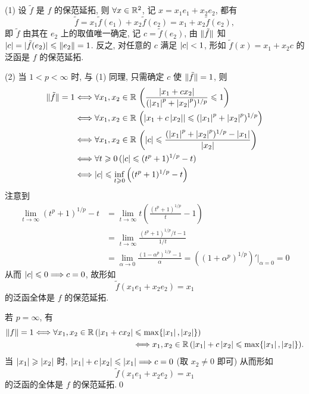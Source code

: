 	\begin{Proof}
		(1) 设 $ \tilde{f} $ 是 $ f $ 的保范延拓, 则 $ \forall x\in\mathbb{R}^{2} $, 记 $ x=x_{1}e_{1}+x_{2}e_{2} $, 都有
		\[
			\tilde{f} = x_{1}\tilde{f}(e_{1})+x_{2}\tilde{f}(e_{2})=x_{1}+x_{2}\tilde{f}(e_{2}),
		\]
		即 $ \tilde{f} $ 由其在 $ e_{2} $ 上的取值唯一确定, 记 $ c=\tilde{f}(e_{2}) $, 由 $ \lVert \tilde{f}\rVert $ 知 $ \left| c \right| =\lvert \tilde{f}(e_{2})\rvert\leqslant\left\| e_{2} \right\|=1 $. 反之, 对任意的 $ c $ 满足 $ \left| c \right| <1 $, 形如 $ \tilde{f}(x)=x_{1}+x_{2}c $ 的泛函是 $ f $ 的保范延拓.

		(2) 当 $ 1<p<\infty $ 时, 与 (1) 同理, 只需确定 $ c $ 使 $ \lVert \tilde{f}\rVert=1 $, 则
		\[
			\begin{aligned}
				\lVert \tilde{f}\rVert=1 & \Longleftrightarrow \forall x_{1}, x_{2}\in\mathbb{R}\,\left( \frac{\left| x_{1}+cx_{2} \right| }{(\left| x_{1} \right| ^{p}+\left| x_{2} \right| ^{p})^{1/p}}\leqslant1 \right)\\
				& \Longleftrightarrow\forall x_{1}, x_{2}\in\mathbb{R}\,\left(\left| x_{1}+c\left| x_{2} \right|  \right| \leqslant(\left| x_{1} \right| ^{p}+\left| x_{2} \right| ^{p})^{1/p} \right)\\
				& \Longleftrightarrow \forall x_{1}, x_{2}\in\mathbb{R}\,\left( \left| c \right| \leqslant\frac{(\left| x_{1} \right| ^{p}+\left| x_{2} \right| ^{p})^{1/p}-\left| x_{1} \right| }{\left| x_{2} \right| } \right)\\
				& \Longleftrightarrow \forall t\geqslant0\,(\left| c \right| \leqslant(t^{p}+1)^{1/p}-t)\\
				&\Longleftrightarrow \left| c \right| \leqslant\inf_{t\geqslant0}\left( (t^{p}+1)^{1/p}-t \right)
			\end{aligned}
		\]
		注意到
		\[
			\begin{aligned}
				\lim_{t\to\infty}(t^{p}+1)^{1/p}-t & =\lim_{t\to\infty}t\left( \frac{(t^{p}+1)^{1/p}}{t}-1 \right)\\
				& = \lim_{t\to\infty}\frac{(t^{p}+1)^{1/p}/t-1}{1/t}\\
				& = \lim_{\alpha\to0}\frac{(1-\alpha^{p})^{1/p}-1}{\alpha}=\left( (1+\alpha^{p})^{1/p} \right)'\Big|_{\alpha=0}=0
			\end{aligned}
		\]
		从而 $ \left| c \right| \leqslant0\Longrightarrow c=0 $, 故形如 
		\[
			\tilde{f}(x_{1}e_{1}+x_{2}e_{2})=x_{1}
		\]
		的泛函全体是 $ f $ 的保范延拓.

		若 $ p=\infty $, 有
		\[
			\begin{aligned}
				\lVert f\rVert=1\Longleftrightarrow \forall x_{1}, x_{2}\in\mathbb{R}\,(\left| x_{1}+cx_{2} \right| & \leqslant\max\{ \left| x_{1} \right| , \left| x_{2} \right|  \})\\
				& \Longleftrightarrow x_{1}, x_{2}\in\mathbb{R}\,(\left| x_{1} \right| +c\left| x_{2} \right| \leqslant\max\{ \left| x_{1} \right| , \left| x_{2} \right|  \}).
			\end{aligned}	
		\]
		当 $ \left| x_{1} \right| \geqslant\left| x_{2} \right|  $ 时, $ \left| x_{1} \right| +c\left| x_{2} \right| \leqslant\left| x_{1} \right| \Longrightarrow c=0 $ (取 $ x_{2}\ne 0 $ 即可) 从而形如
		\[
			\tilde{f}(x_{1}e_{1}+x_{2}e_{2})=x_{1}
		\]
		的泛函的全体是 $ f $ 的保范延拓.\qed
	\end{Proof}

